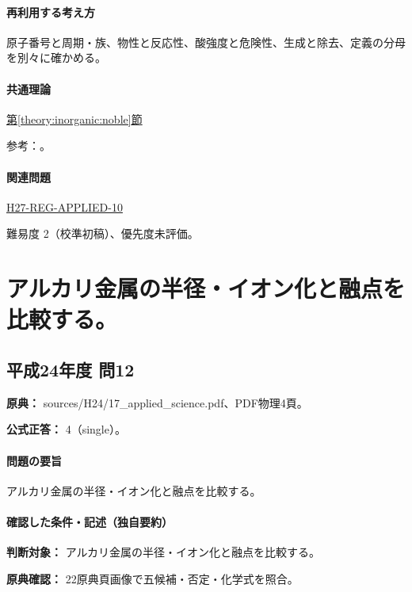 \paragraph{再利用する考え方} 原子番号と周期・族、物性と反応性、酸強度と危険性、生成と除去、定義の分母を別々に確かめる。

\paragraph{共通理論} \hyperref[theory:inorganic:noble]{第\ref*{theory:inorganic:noble}節}

\par 参考：\cite{inorganic_noble_ref}。

\paragraph{関連問題} \hyperref[q:h27-reg-applied-10]{H27-REG-APPLIED-10}

\par 難易度 2（校準初稿）、優先度未評価。

\section{アルカリ金属の半径・イオン化と融点を比較する。}

\subsection{平成24年度 問12}
\label{q:h24-reg-applied-12}

\noindent\textbf{原典：} sources/H24/17\_applied\_science.pdf、PDF物理4頁。

\textbf{公式正答：} 4（single）。

\paragraph{問題の要旨} アルカリ金属の半径・イオン化と融点を比較する。

\paragraph{確認した条件・記述（独自要約）}\mbox{}\par

\noindent\textbf{判断対象：} アルカリ金属の半径・イオン化と融点を比較する。\par

\noindent\textbf{原典確認：} 22原典頁画像で五候補・否定・化学式を照合。\par

